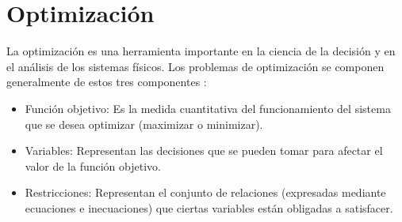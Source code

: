 




\section{Optimización}

La optimización es una herramienta importante en la ciencia de la decisión y en el análisis de los sistemas físicos. Los problemas de optimización se componen generalmente de estos tres componentes \citep{Ramos2010ModelosOptimizacion}:

\begin{itemize}
    \item Función objetivo: Es la medida cuantitativa del funcionamiento del sistema que se desea optimizar (maximizar o minimizar).
    \item Variables: Representan las decisiones que se pueden tomar para afectar el valor de la función objetivo.
    \item Restricciones: Representan el conjunto de relaciones (expresadas mediante ecuaciones e inecuaciones) que ciertas variables están obligadas a satisfacer.
\end{itemize}


